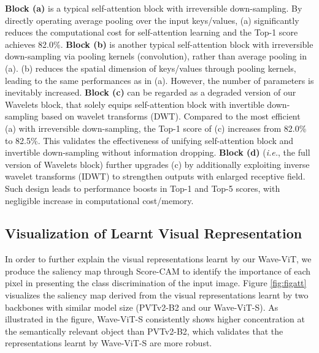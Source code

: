 \documentclass[runningheads]{llncs}
\begin{document}
\textbf{Block (a)} is a typical self-attention block with irreversible down-sampling. By directly operating average pooling over the input keys/values, (a) significantly reduces the computational cost for self-attention learning and the Top-1 score achieves 82.0\%.
\textbf{Block (b)} is another typical self-attention block with irreversible down-sampling via pooling kernels (convolution), rather than average pooling in (a). (b) reduces the spatial dimension of keys/values through pooling kernels, leading to the same performances as in (a). However, the number of parameters is inevitably increased.
\textbf{Block (c)} can be regarded as a degraded version of our Wavelets block, that solely equips self-attention block with invertible down-sampling based on wavelet transforms (DWT). Compared to the most efficient (a) with irreversible down-sampling, the Top-1 score of (c) increases from 82.0\% to 82.5\%. This validates the effectiveness of unifying self-attention block and invertible down-sampling without information dropping.
\textbf{Block (d)} (\emph{i.e.}, the full version of Wavelets block) further upgrades (c) by additionally exploiting inverse wavelet transforms (IDWT) to strengthen outputs with enlarged receptive field. Such design leads to performance boosts in Top-1 and Top-5 scores, with negligible increase in computational cost/memory.

\begin{figure*}[!tb]
\vspace{-0.1in}
\vspace{-0.2in}
\caption{\small Visualization of Score-CAM \cite{wang2020score} for PVTv2-B2 \cite{wang2021pvtv2} and our Wave-ViT-S on six images in ImageNet1K dataset.}
\label{fig:figatt}
\vspace{-0.2in}
\end{figure*}

\subsection{Visualization of Learnt Visual Representation}
In order to further explain the visual representations learnt by our Wave-ViT, we produce the saliency map through Score-CAM \cite{wang2020score} to identify the importance of each pixel in presenting the class discrimination of the input image. Figure \ref{fig:figatt} visualizes the saliency map derived from the visual representations learnt by two backbones with similar model size (PVTv2-B2 and our Wave-ViT-S). As illustrated in the figure, Wave-ViT-S consistently shows higher concentration at the semantically relevant object than PVTv2-B2, which validates that the representations learnt by Wave-ViT-S are more robust.
\end{document}
